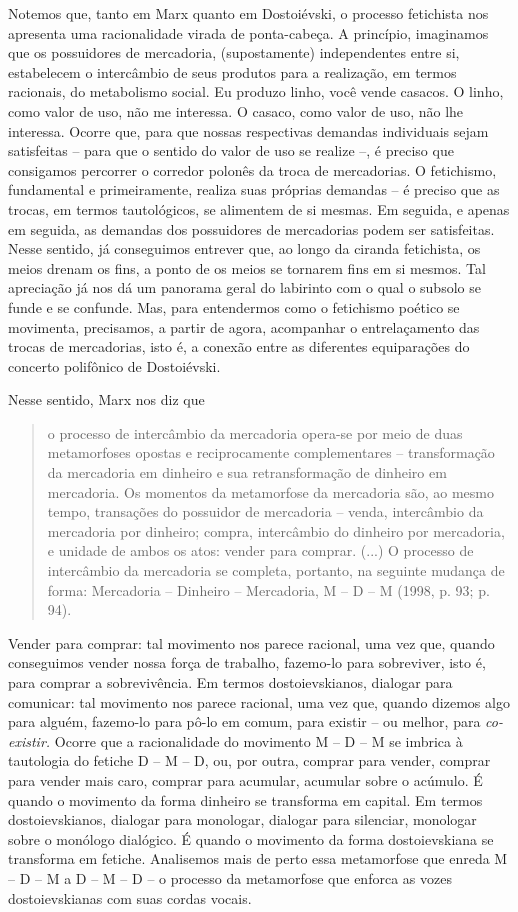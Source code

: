 Notemos que, tanto em Marx quanto em Dostoiévski, o processo fetichista
nos apresenta uma racionalidade virada de ponta-cabeça. A princípio,
imaginamos que os possuidores de mercadoria, (supostamente)
independentes entre si, estabelecem o intercâmbio de seus produtos para
a realização, em termos racionais, do metabolismo social. Eu produzo
linho, você vende casacos. O linho, como valor de uso, não me interessa.
O casaco, como valor de uso, não lhe interessa. Ocorre que, para que
nossas respectivas demandas individuais sejam satisfeitas -- para que o
sentido do valor de uso se realize --, é preciso que consigamos
percorrer o corredor polonês da troca de mercadorias. O fetichismo,
fundamental e primeiramente, realiza suas próprias demandas -- é preciso
que as trocas, em termos tautológicos, se alimentem de si mesmas. Em
seguida, e apenas em seguida, as demandas dos possuidores de mercadorias
podem ser satisfeitas. Nesse sentido, já conseguimos entrever que, ao
longo da ciranda fetichista, os meios drenam os fins, a ponto de os
meios se tornarem fins em si mesmos. Tal apreciação já nos dá um
panorama geral do labirinto com o qual o subsolo se funde e se confunde.
Mas, para entendermos como o fetichismo poético se movimenta,
precisamos, a partir de agora, acompanhar o entrelaçamento das trocas de
mercadorias, isto é, a conexão entre as diferentes equiparações do
concerto polifônico de Dostoiévski.

Nesse sentido, Marx nos diz que

\begin{quote}
o processo de intercâmbio da mercadoria opera-se por meio de duas
metamorfoses opostas e reciprocamente complementares -- transformação da
mercadoria em dinheiro e sua retransformação de dinheiro em mercadoria.
Os momentos da metamorfose da mercadoria são, ao mesmo tempo, transações
do possuidor de mercadoria -- venda, intercâmbio da mercadoria por
dinheiro; compra, intercâmbio do dinheiro por mercadoria, e unidade de
ambos os atos: vender para comprar. (...) O processo de intercâmbio da
mercadoria se completa, portanto, na seguinte mudança de forma:
Mercadoria -- Dinheiro -- Mercadoria, M -- D -- M (1998, p. 93; p. 94).
\end{quote}

Vender para comprar: tal movimento nos parece racional, uma vez que,
quando conseguimos vender nossa força de trabalho, fazemo-lo para
sobreviver, isto é, para comprar a sobrevivência. Em termos
dostoievskianos, dialogar para comunicar: tal movimento nos parece
racional, uma vez que, quando dizemos algo para alguém, fazemo-lo para
pô-lo em comum, para existir -- ou melhor, para \emph{co-existir.}
Ocorre que a racionalidade do movimento M -- D -- M se imbrica à
tautologia do fetiche D -- M -- D, ou, por outra, comprar para vender,
comprar para vender mais caro, comprar para acumular, acumular sobre o
acúmulo. É quando o movimento da forma dinheiro se transforma em
capital. Em termos dostoievskianos, dialogar para monologar, dialogar
para silenciar, monologar sobre o monólogo dialógico. É quando o
movimento da forma dostoievskiana se transforma em fetiche. Analisemos
mais de perto essa metamorfose que enreda M -- D -- M a D -- M -- D -- o
processo da metamorfose que enforca as vozes dostoievskianas com suas
cordas vocais.


